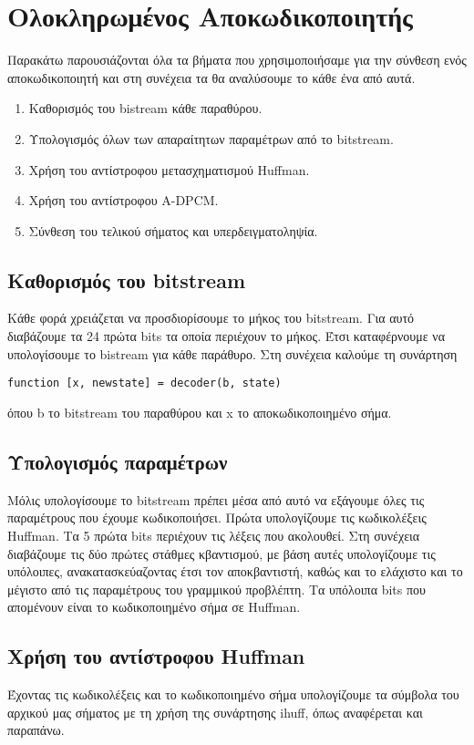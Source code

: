 \section{Ολοκληρωμένος Αποκωδικοποιητής}
\par Παρακάτω παρουσιάζονται όλα τα βήματα που χρησιμοποιήσαμε για την σύνθεση ενός
αποκωδικοποιητή και στη συνέχεια τα θα αναλύσουμε το κάθε ένα από αυτά.
\begin{enumerate}
\item Καθορισμός του bistream κάθε παραθύρου.
\item Υπολογισμός όλων των απαραίτητων παραμέτρων από το bitstream.
\item Χρήση του αντίστροφου μετασχηματισμού Huffman.
\item Χρήση του αντίστροφου A-DPCM.
\item Σύνθεση του τελικού σήματος και υπερδειγματοληψία.
\end{enumerate}

\subsection{Καθορισμός του bitstream}
\par Κάθε φορά χρειάζεται να προσδιορίσουμε το μήκος του bitstream. Για
αυτό διαβάζουμε τα 24 πρώτα bits τα οποία περιέχουν το μήκος. Έτσι καταφέρνουμε
να υπολογίσουμε το bistream για κάθε παράθυρο. Στη συνέχεια καλούμε τη συνάρτηση
\begin{lstlisting}[style=MyMatlab]
 function [x, newstate] = decoder(b, state)
\end{lstlisting}
όπου b το bitstream του παραθύρου και x το αποκωδικοποιημένο σήμα.

\subsection{Υπολογισμός παραμέτρων}
\par Μόλις υπολογίσουμε το bitstream πρέπει μέσα από αυτό να εξάγουμε όλες τις
παραμέτρους που έχουμε κωδικοποιήσει. Πρώτα υπολογίζουμε τις κωδικολέξεις Huffman.
Τα 5 πρώτα bits περιέχουν τις λέξεις που ακολουθεί. Στη συνέχεια διαβάζουμε τις δύο πρώτες στάθμες
κβαντισμού, με βάση αυτές υπολογίζουμε τις υπόλοιπες, ανακατασκεύαζοντας έτσι τον αποκβαντιστή,
καθώς και το ελάχιστο και το μέγιστο από τις παραμέτρους
του γραμμικού προβλέπτη. Τα υπόλοιπα bits που απομένουν είναι το κωδικοποιημένο
σήμα σε Huffman.

\subsection{Χρήση του αντίστροφου Huffman}
\par Έχοντας τις κωδικολέξεις και το κωδικοποιημένο σήμα υπολογίζουμε τα σύμβολα
του αρχικού μας σήματος με τη χρήση της συνάρτησης ihuff, όπως αναφέρεται και
παραπάνω.

